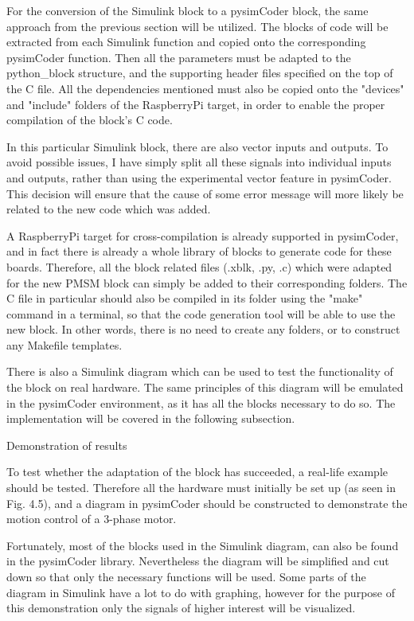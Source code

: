 \quad For the conversion of the Simulink block to a pysimCoder block, the same approach from the
previous section will be utilized.  The blocks of code will be extracted from each Simulink
function and copied onto the corresponding pysimCoder function. Then all the parameters must be
adapted to the python_block structure, and the supporting header files specified on the top of
the C file. All the dependencies mentioned must also be copied onto the "devices" and "include"
folders of the RaspberryPi target, in order to enable the proper compilation of the block's C
code.

\quad In this particular Simulink block, there are also vector inputs and outputs. To avoid
possible issues, I have simply  split all these signals into individual inputs and outputs,
rather than using the experimental vector feature in pysimCoder. This decision will ensure
that the cause of some error message will more likely be related to the new code which was
added.

\quad A RaspberryPi target for cross-compilation is already supported in pysimCoder, and in
fact there is already a whole library of blocks to generate code for these boards. Therefore,
all the block related files (.xblk, .py, .c) which were adapted for the new PMSM block can
simply be added to their corresponding folders. The C file in particular should also be
compiled in its folder using the "make" command in a terminal, so that the code generation
tool will be able to use the new block.  In other words, there is no need to create any folders,
or to construct any Makefile templates.

\quad There is also a Simulink diagram which can be used to test the functionality
of the block on real hardware. The same principles of this diagram will be emulated in the
pysimCoder environment, as it has all the blocks necessary to do so. The implementation will
be covered in the following subsection. 


\secc Demonstration of results

\qquad To test whether the adaptation of the block has succeeded, a real-life example should be
tested. Therefore all the hardware must initially be set up (as seen in Fig. 4.5), and a diagram
in pysimCoder should be constructed to demonstrate the motion control of a 3-phase motor. 

\quad Fortunately, most of the blocks used in the Simulink diagram, can also be found
in the pysimCoder library. Nevertheless the diagram will be simplified and cut down so that only
the necessary functions will be used. Some parts of the diagram in Simulink have a lot to do with
graphing, however for the purpose of this demonstration only the signals of higher interest will
be visualized.


